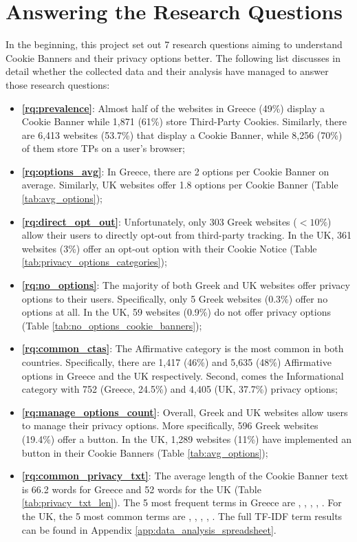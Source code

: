 \documentclass[../main.tex]{subfiles}
\begin{document}
\section{Answering the Research Questions}
In the beginning, this project set out 7 research questions aiming to understand Cookie Banners and their privacy options better. The following list discusses in detail whether the collected data and their analysis have managed to answer those research questions: 

\begin{itemize}
    \item \textbf{\ref{rq:prevalence}}: Almost half of the websites in Greece (49\%) display a Cookie Banner while 1,871 (61\%) store Third-Party Cookies. Similarly, there are 6,413 websites (53.7\%) that display a Cookie Banner, while 8,256 (70\%) of them store TPs on a user’s browser;

    \item \textbf{\ref{rq:options_avg}}: In Greece, there are 2 options per Cookie Banner on average. Similarly, UK websites offer 1.8 options per Cookie Banner (Table \ref{tab:avg_options});

    \item \textbf{\ref{rq:direct_opt_out}}: Unfortunately, only 303 Greek websites ($<10\%$) allow their users to directly opt-out from third-party tracking. In the UK, 361 websites (3\%) offer an opt-out option with their Cookie Notice (Table \ref{tab:privacy_options_categories});

    \item \textbf{\ref{rq:no_options}}: The majority of both Greek and UK websites offer privacy options to their users. Specifically, only 5 Greek websites (0.3\%) offer no options at all. In the UK, 59 websites (0.9\%) do not offer privacy options (Table \ref{tab:no_options_cookie_banners});

    \item \textbf{\ref{rq:common_ctas}}: The Affirmative category is the most common in both countries. Specifically, there are 1,417 (46\%) and 5,635 (48\%) Affirmative options in Greece and the UK respectively. Second, comes the Informational category with 752 (Greece, 24.5\%) and 4,405 (UK, 37.7\%) privacy options;

    \item \textbf{\ref{rq:manage_options_count}}: Overall, Greek and UK websites allow users to manage their privacy options. More specifically, 596 Greek websites (19.4\%) offer a  button. In the UK, 1,289 websites (11\%) have implemented an  button in their Cookie Banners (Table \ref{tab:avg_options});

    \item \textbf{\ref{rq:common_privacy_txt}}: The average length of the Cookie Banner text is 66.2 words for Greece and 52 words for the UK (Table \ref{tab:privacy_txt_len}). The 5 most frequent terms in Greece are , , , , . For the UK, the 5 most common terms are , , , , . The full TF-IDF term results can be found in Appendix \ref{app:data_analysis_spreadsheet}.
\end{itemize}
\end{document}
